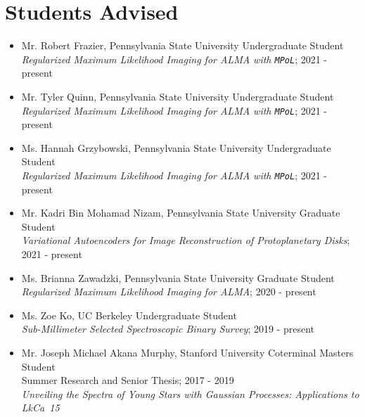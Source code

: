 \section*{Students Advised}
\begin{itemize}
  \item Mr. Robert Frazier, Pennsylvania State University Undergraduate Student \\ 
  \emph{Regularized Maximum Likelihood Imaging for ALMA with \texttt{MPoL}}; 2021 - present
  \item Mr. Tyler Quinn, Pennsylvania State University Undergraduate Student \\ 
  \emph{Regularized Maximum Likelihood Imaging for ALMA with \texttt{MPoL}}; 2021 - present
  \item Ms. Hannah Grzybowski, Pennsylvania State University Undergraduate Student \\ 
  \emph{Regularized Maximum Likelihood Imaging for ALMA with \texttt{MPoL}}; 2021 - present
  \item Mr. Kadri Bin Mohamad Nizam, Pennsylvania State University Graduate Student \\ 
  \emph{Variational Autoencoders for Image Reconstruction of Protoplanetary Disks}; 2021 - present
  \item Ms. Brianna Zawadzki, Pennsylvania State University Graduate Student \\
  \emph{Regularized Maximum Likelihood Imaging for ALMA}; 2020 - present
  \item Ms. Zoe Ko, UC Berkeley Undergraduate Student \\ 
  \emph{Sub-Millimeter Selected Spectroscopic Binary Survey}; 2019 - present 
  \item Mr. Joseph Michael Akana Murphy, Stanford University Coterminal Masters Student \\
  Summer Research and Senior Thesis; 2017 - 2019\\
  \emph{Unveiling the Spectra of Young Stars with Gaussian Processes: Applications to LkCa~15}
\end{itemize}
